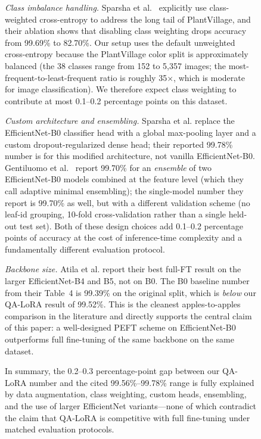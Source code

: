 \documentclass[conference]{IEEEtran}
\begin{document}
\begin{figure}[htbp]
\textit{Class imbalance handling.} Sparsha et al.~\cite{sparsha2025} explicitly use class-weighted cross-entropy to address the long tail of PlantVillage, and their ablation shows that disabling class weighting drops accuracy from 99.69\% to 82.70\%. Our setup uses the default unweighted cross-entropy because the PlantVillage color split is approximately balanced (the 38 classes range from 152 to 5{,}357 images; the most-frequent-to-least-frequent ratio is roughly 35$\times$, which is moderate for image classification). We therefore expect class weighting to contribute at most 0.1--0.2 percentage points on this dataset.

\textit{Custom architecture and ensembling.} Sparsha et al. replace the EfficientNet-B0 classifier head with a global max-pooling layer and a custom dropout-regularized dense head; their reported 99.78\% number is for this modified architecture, not vanilla EfficientNet-B0. Gentiluomo et al.~\cite{gentiluomo2022} report 99.70\% for an \emph{ensemble} of two EfficientNet-B0 models combined at the feature level (which they call adaptive minimal ensembling); the single-model number they report is 99.70\% as well, but with a different validation scheme (no leaf-id grouping, 10-fold cross-validation rather than a single held-out test set). Both of these design choices add 0.1--0.2 percentage points of accuracy at the cost of inference-time complexity and a fundamentally different evaluation protocol.

\textit{Backbone size.} Atila et al. report their best full-FT result on the larger EfficientNet-B4 and B5, not on B0. The B0 baseline number from their Table~4 is 99.39\% on the original split, which is \emph{below} our QA-LoRA result of 99.52\%. This is the cleanest apples-to-apples comparison in the literature and directly supports the central claim of this paper: a well-designed PEFT scheme on EfficientNet-B0 outperforms full fine-tuning of the same backbone on the same dataset.

In summary, the 0.2--0.3 percentage-point gap between our QA-LoRA number and the cited 99.56\%--99.78\% range is fully explained by data augmentation, class weighting, custom heads, ensembling, and the use of larger EfficientNet variants---none of which contradict the claim that QA-LoRA is competitive with full fine-tuning under matched evaluation protocols.


\end{figure}
\end{document}
